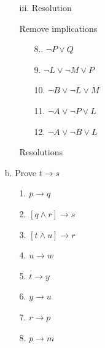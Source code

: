 \documentclass[11pt]{article}
\begin{document}
\begin{flushleft}
\begin{enumerate}
\begin{enumerate}
            \item[iii.] Resolution \par
                Remove implications
                \begin{center}
                    \begin{minipage}{0.4\textwidth}
                        \begin{enumerate}
                            \item[8..] $\neg P \vee Q$
                            \item[9.] $\neg L \vee \neg M \vee P$
                            \item[10.] $\neg B \vee \neg L \vee M$
                            \item[11.] $\neg A \vee \neg P \vee L$
                            \item[12.] $\neg A \vee \neg B \vee L$
                        \end{enumerate}
                    \end{minipage}
                \end{center}
                Resolutions

        \end{enumerate}

    \item[b.] Prove $t \rightarrow s$

        \begin{center}
            \begin{minipage}{0.4\textwidth}
                \begin{enumerate}
                    \item[1.] $p \rightarrow q$
                    \item[2.] $[q \land r] \rightarrow s$
                    \item[3.] $[t \land u] \rightarrow r$
                    \item[4.] $u \rightarrow w$
                    \item[5.] $t \rightarrow y$
                    \item[6.] $y \rightarrow u$
                    \item[7.] $r \rightarrow p$
                    \item[8.] $p \rightarrow m$
                \end{enumerate}
            \end{minipage}
        \end{center}


\end{enumerate}
\end{flushleft}
\end{document}
